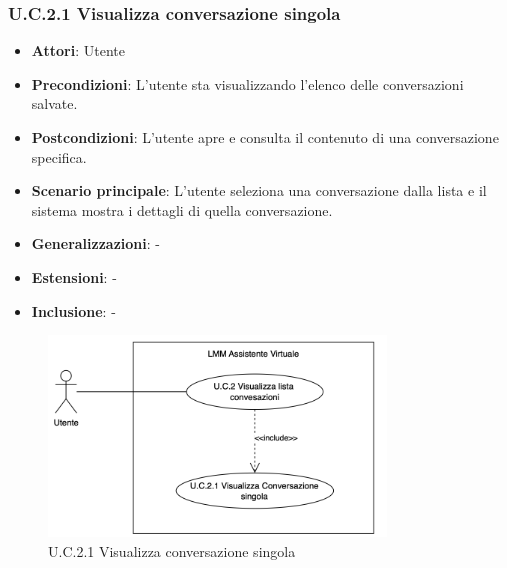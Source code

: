 \subsubsection{U.C.2.1 Visualizza conversazione singola}
\begin{itemize}
    \item \textbf{Attori}: Utente
    \item \textbf{Precondizioni}: L'utente sta visualizzando l'elenco delle conversazioni salvate.
    \item \textbf{Postcondizioni}: L'utente apre e consulta il contenuto di una conversazione specifica.
    \item \textbf{Scenario principale}: L'utente seleziona una conversazione dalla lista e il sistema mostra i dettagli di quella conversazione.
    \item \textbf{Generalizzazioni}: -
    \item \textbf{Estensioni}: -
    \item \textbf{Inclusione}: -
\end{itemize}
\begin{figure}[H]
    \centering
    \includegraphics[width=0.8\textwidth]{img/U.C.2.1.png}
    \caption{U.C.2.1 Visualizza conversazione singola}
\end{figure}
\newpage

